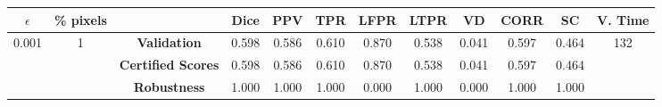 \begin{longtable}{ c  c | c | c  c  c  c  c  c  c c c}
\toprule \textbf{$\epsilon$} & \textbf{\% pixels} & & \textbf{Dice} & \textbf{PPV} & \textbf{TPR} & \textbf{LFPR} & \textbf{LTPR} & \textbf{VD} & \textbf{CORR} & \textbf{SC} & \textbf{V. Time} \\
\midrule 
\multirow{3}{*}{0.001}  & \multirow{3}{*}{1} &\textbf{Validation} & 0.598 & 0.586 & 0.610 & 0.870 & 0.538 & 0.041 & 0.597 & 0.464 & \multirow{3}{*}{132} \\
 & & \textbf{Certified Scores} & 0.598 & 0.586 & 0.610 & 0.870 & 0.538 & 0.041 & 0.597 & 0.464 & \\
& & \textbf{Robustness} & 1.000 & 1.000 & 1.000 & 0.000 & 1.000 & 0.000 & 1.000 & 1.000 & \\
\end{longtable}